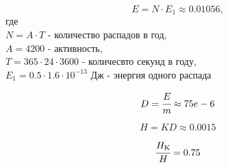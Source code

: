 \documentclass[a4paper, 14pt]{extarticle}
\begin{document}
\begin{equation*}
    E = N \cdot E_1 \approx 0.01056, 
\end{equation*}
где \\
$N = A \cdot T$ - количество распадов в год, \\
$A = 4200$ - активность, \\
$T = 365 \cdot 24 \cdot 3600$ - количесвто секунд в году, \\
$E_1 = 0.5 \cdot 1.6 \cdot 10^{-13}$ Дж - энергия одного распада 

\begin{equation*}
    D = \cfrac{E}{m} \approx 75e-6
\end{equation*}

\begin{equation*}
    H = K D \approx 0.0015
\end{equation*}

\begin{equation*}
    \cfrac{H_{\mathrm{K}}}{H} = 0.75
\end{equation*}
\end{document}

